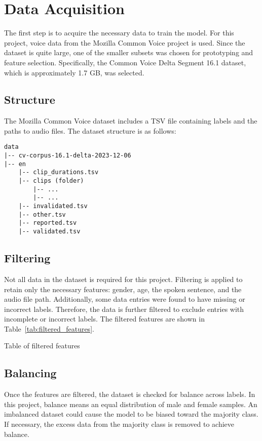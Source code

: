 \section{Data Acquisition}
\label{sec:dataset}

The first step is to acquire the necessary data to train the model. For this project, voice data from the Mozilla Common Voice project is used. Since the dataset is quite large, one of the smaller subsets was chosen for prototyping and feature selection. Specifically, the Common Voice Delta Segment 16.1 dataset, which is approximately 1.7 GB, was selected. 

\subsection{Structure}
The Mozilla Common Voice dataset includes a TSV file containing labels and the paths to audio files. The dataset structure is as follows:


{\iosevka
\begin{verbatim}
data
|-- cv-corpus-16.1-delta-2023-12-06
|-- en
    |-- clip_durations.tsv
    |-- clips (folder)
        |-- ...
        |-- ...
    |-- invalidated.tsv
    |-- other.tsv
    |-- reported.tsv
    |-- validated.tsv
\end{verbatim}
}



\subsection{Filtering}
Not all data in the dataset is required for this project. Filtering is applied to retain only the necessary features: gender, age, the spoken sentence, and the audio file path. Additionally, some data entries were found to have missing or incorrect labels. Therefore, the data is further filtered to exclude entries with incomplete or incorrect labels. The filtered features are shown in Table~\ref{tab:filtered_features}.


\begin{table}[h]
    \centering %
    \begin{adjustbox}{max width=\textwidth}
    \end{adjustbox}
    \caption{Table of filtered features}
    \label{tab:filtered_features}
\end{table}


\subsection{Balancing}
Once the features are filtered, the dataset is checked for balance across labels. In this project, balance means an equal distribution of male and female samples. An imbalanced dataset could cause the model to be biased toward the majority class. If necessary, the excess data from the majority class is removed to achieve balance.


